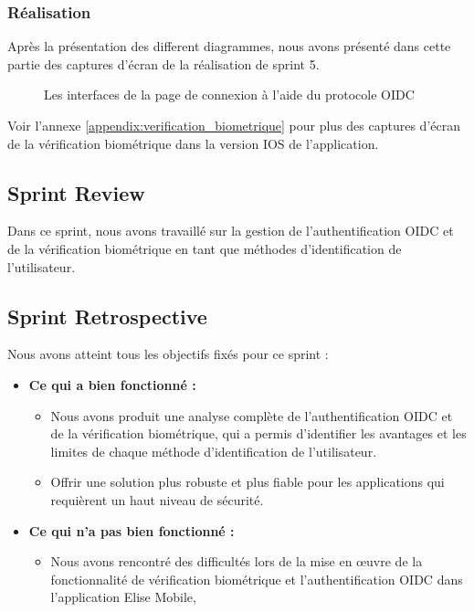 \subsubsection{Réalisation}

Après la présentation des different diagrammes, nous avons présenté dans cette partie des captures d'écran de la réalisation de sprint 5.\\
\begin{figure}[H]
  \centering
  \caption{Les interfaces de la page de connexion à l'aide du protocole OIDC}
  \label{fig:realisation_OIDC}
\end{figure}
Voir l'annexe \ref{appendix:verification_biometrique} pour plus des captures d'écran de la vérification biométrique dans la version IOS de l'application.

\subsection{Sprint Review}
Dans ce sprint, nous avons travaillé sur la gestion de l'authentification OIDC et de la vérification biométrique en tant que méthodes d'identification de l'utilisateur.

\subsection{Sprint Retrospective}
Nous avons atteint tous les objectifs fixés pour ce sprint :
\begin{itemize}
  \item \textbf{Ce qui a bien fonctionné :}
  \begin{itemize}
    \item Nous avons produit une analyse complète de l'authentification OIDC et de la vérification biométrique, qui a permis d'identifier les avantages et les limites de chaque méthode d'identification de l'utilisateur.
    \item Offrir une solution plus robuste et plus fiable pour les applications qui requièrent un haut niveau de sécurité.
  \end{itemize}
    \item \textbf{Ce qui n'a pas bien fonctionné :}
    \begin{itemize}
      \item Nous avons rencontré des difficultés lors de la mise en œuvre de la fonctionnalité de vérification biométrique et l'authentification OIDC dans l'application Elise Mobile,
    \end{itemize}
      
\end{itemize}
